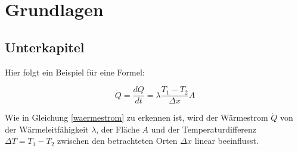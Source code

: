 \clearpage
\chapter{\textbf{Grundlagen}}\label{grundlagen}

\section{Unterkapitel}\label{unterkapitel}

Hier folgt ein Beispiel für eine Formel:

\begin{equation}\label{waermestrom}
\dot Q = \frac{dQ}{dt} = \lambda \frac{T_1-T_2}{\Delta x} A
\end{equation}

Wie in Gleichung \ref{waermestrom} zu erkennen ist, wird der Wärmestrom $\dot Q$ von der Wärmeleitfähigkeit $\lambda$, der Fläche $A$ und der Temperaturdifferenz $\Delta T = T_1-T_2$ zwischen den betrachteten Orten $\Delta x$ linear beeinflusst.



